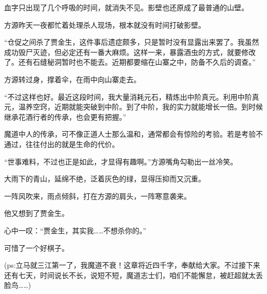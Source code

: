 \begin{this_body}
血字只出现了几个呼吸的时间，就消失不见。影壁也还原成了最普通的山壁。

方源昨天一夜都忙着处理杀人现场，根本就没有时间打破影壁。

“仓促之间杀了贾金生，这件事后遗症颇多，只是暂时没有显露出来罢了。我虽然成功毁尸灭迹，但必定还有一番大麻烦。这样一来，暴露酒虫的方式，就要修改了。还有石缝秘洞暂时也不能去。近期都要缩在山寨之中，防备不久后的调查。”

方源转过身，撑着伞，在雨中向山寨走去。

“不过这样也好。最近这段时间，我大量消耗元石，精炼出中阶真元。利用中阶真元，温养空窍，近期就能突破到中阶。到了中阶，我的实力就能增长一倍。到时候继承花酒行者的传承，也会更有把握。”

魔道中人的传承，可不像正道人士那么温和，通常都会有惊险的考验。若是考验不通过，往往付出的就是生命的代价。

“世事难料，不过也正是如此，才显得有趣啊。”方源嘴角勾勒出一丝冷笑。

大雨下的青山，延绵不绝，泛着灰色的绿，显得压抑而又沉重。

一阵风吹来，雨点倾斜，打在方源的肩头，一阵寒意袭来。

他又想到了贾金生。

心中一叹：“贾金生，其实我……不想杀你的。”

可惜了一个好棋子。

(ps:立马就三江第一了，我魔道不衰！这章将近四千字，奉献给大家。不过接下来还有七天，时间说长不长，说短不短，魔道志士们，咱们不能懈怠，被赶超就太丢脸鸟……)

\end{this_body}

